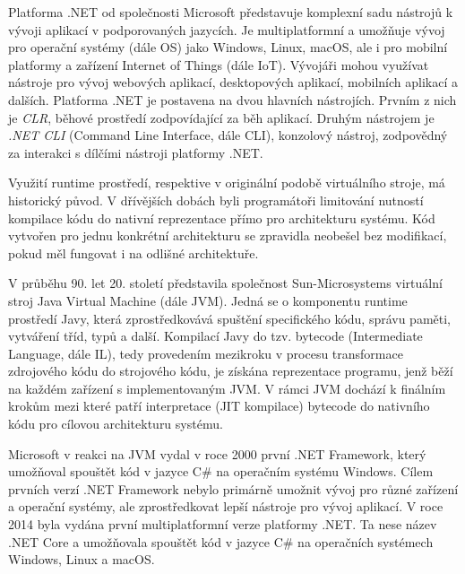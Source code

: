 

Platforma .NET od společnosti Microsoft představuje komplexní sadu nástrojů k vývoji aplikací v podporovaných jazycích. Je multiplatformní a umožňuje vývoj pro operační systémy (dále OS) jako Windows, Linux, macOS, ale i pro mobilní platformy a zařízení Internet of Things (dále IoT). Vývojáři mohou využívat nástroje pro vývoj webových aplikací, desktopových aplikací, mobilních aplikací a dalších. Platforma .NET je postavena na dvou hlavních nástrojích. Prvním z nich je \textit{CLR}, běhové prostředí zodpovídající za běh aplikací. Druhým nástrojem je \textit{.NET CLI} (Command Line Interface, dále CLI), konzolový nástroj, zodpovědný za interakci s dílčími nástroji platformy .NET.


Využití runtime prostředí, respektive v originální podobě virtuálního stroje, má historický původ. V dřívějších dobách byli programátoři limitování nutností kompilace kódu do nativní reprezentace přímo pro architekturu systému. Kód vytvořen pro jednu konkrétní architekturu se zpravidla neobešel bez modifikací, pokud měl fungovat i na odlišné architektuře.

V průběhu 90. let 20. století představila společnost Sun-Microsystems virtuální stroj Java Virtual Machine (dále JVM). Jedná se o komponentu runtime prostředí Javy, která zprostředkovává spuštění specifického kódu, správu paměti, vytváření tříd, typů a další. Kompilací Javy do tzv. bytecode (Intermediate Language, dále IL), tedy provedením mezikroku v procesu transformace zdrojového kódu do strojového kódu, je získána reprezentace programu, jenž běží na každém zařízení s implementovaným JVM. V rámci JVM dochází k finálním krokům mezi které patří interpretace (JIT kompilace) bytecode do nativního kódu pro cílovou architekturu systému. 

Microsoft v reakci na JVM vydal v roce 2000 první .NET Framework, který umožňoval spouštět kód v jazyce C\# na operačním systému Windows. Cílem prvních verzí .NET Framework nebylo primárně umožnit vývoj pro různé zařízení a operační systémy, ale zprostředkovat lepší nástroje pro vývoj aplikací. \cite{Troelsen2003} V roce 2014 byla vydána první multiplatformní verze platformy .NET. Ta nese název .NET Core a umožňovala spouštět kód v jazyce C\# na operačních systémech Windows, Linux a macOS. 

